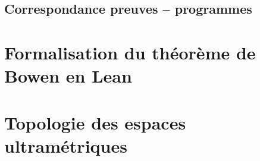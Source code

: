 \documentclass[a4paper, 11pt, twoside]{article}
\begin{document}
    \subsection{Correspondance preuves -- programmes}
      

  \newpage
  \section{Formalisation du théorème de Bowen en Lean}
    

  \newpage
  \section{Topologie des espaces ultramétriques}
    

  \newpage
  \nocite{*}
  \thispagestyle{plain}
  \printbibliography[heading=bibintoc, title={Bibliographie}]

\end{document}
